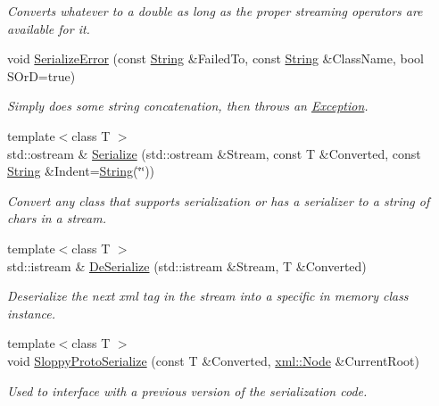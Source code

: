 \begin{DoxyCompactItemize}
\begin{DoxyCompactList}\small\item\em Converts whatever to a double as long as the proper streaming operators are available for it. \item\end{DoxyCompactList}\item 
void \hyperlink{namespacephys_a3d75403c50afb8ed658bb9f22a70939f}{SerializeError} (const \hyperlink{namespacephys_aa03900411993de7fbfec4789bc1d392e}{String} \&FailedTo, const \hyperlink{namespacephys_aa03900411993de7fbfec4789bc1d392e}{String} \&ClassName, bool SOrD=true)
\begin{DoxyCompactList}\small\item\em Simply does some string concatenation, then throws an \hyperlink{classphys_1_1Exception}{Exception}. \item\end{DoxyCompactList}\item 
{\footnotesize template$<$class T $>$ }\\std::ostream \& \hyperlink{namespacephys_aca0ab1969773dbd0d8799bdd6a5cb745}{Serialize} (std::ostream \&Stream, const T \&Converted, const \hyperlink{namespacephys_aa03900411993de7fbfec4789bc1d392e}{String} \&Indent=\hyperlink{namespacephys_aa03900411993de7fbfec4789bc1d392e}{String}(\char`\"{}\char`\"{}))
\begin{DoxyCompactList}\small\item\em Convert any class that supports serialization or has a serializer to a string of chars in a stream. \item\end{DoxyCompactList}\item 
{\footnotesize template$<$class T $>$ }\\std::istream \& \hyperlink{namespacephys_adbc8714ac6e9a549a5ef261d1bda1505}{DeSerialize} (std::istream \&Stream, T \&Converted)
\begin{DoxyCompactList}\small\item\em Deserialize the next xml tag in the stream into a specific in memory class instance. \item\end{DoxyCompactList}\item 
{\footnotesize template$<$class T $>$ }\\void \hyperlink{namespacephys_a0486c9d6d2e192963225155a6ba40506}{SloppyProtoSerialize} (const T \&Converted, \hyperlink{classphys_1_1xml_1_1Node}{xml::Node} \&CurrentRoot)
\begin{DoxyCompactList}\small\item\em Used to interface with a previous version of the serialization code. \item\end{DoxyCompactList}\end{DoxyCompactItemize}


